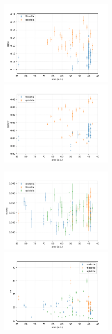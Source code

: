 \documentclass[10pt,a4paper,onecolumn]{article}
\theoremstyle{definition}
\theoremstyle{remark}
\begin{document}
\begin{figure}[htpb!]
	\centering
	\begin{multicols}{2}
		\includegraphics[width=0.5\textwidth]{graficos/PRON_no_tempo.png}  \\ 
		\includegraphics[width=0.5\textwidth]{graficos/PUNCT_no_tempo.png}  \\
	\end{multicols}\vspace{-0.75cm}
	\begin{multicols}{2}
		\includegraphics[width=0.5\textwidth]{graficos/SCONJ_no_tempo.png}  \\
		\includegraphics[width=0.5\textwidth]{graficos/len_no_tempo.png}  \\

\end{multicols}
\end{figure}
\end{document}

